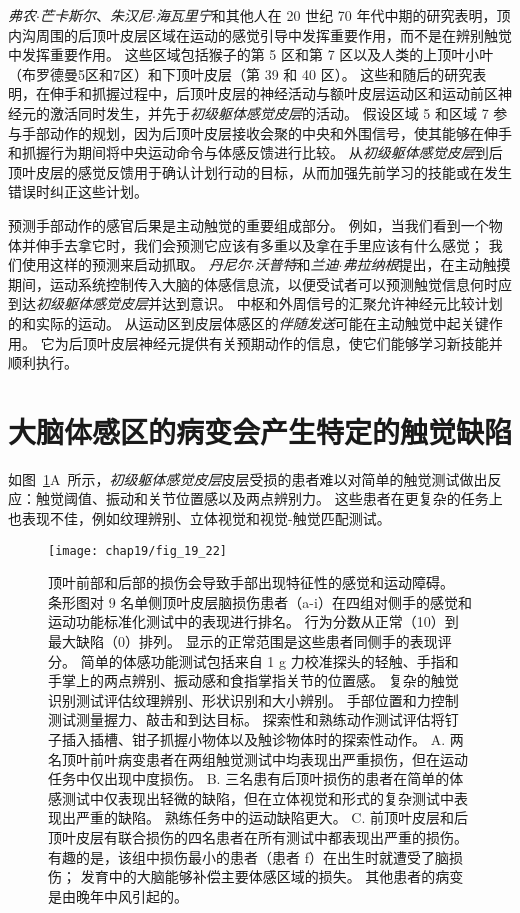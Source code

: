 \textit{弗农$\cdot$芒卡斯尔}、\textit{朱汉尼$\cdot$海瓦里宁}和其他人在 20 世纪 70 年代中期的研究表明，顶内沟周围的后顶叶皮层区域在运动的感觉引导中发挥重要作用，而不是在辨别触觉中发挥重要作用。
这些区域包括猴子的第 5 区和第 7 区以及人类的上顶叶小叶（布罗德曼5区和7区）和下顶叶皮层（第 39 和 40 区）。
这些和随后的研究表明，在伸手和抓握过程中，后顶叶皮层的神经活动与额叶皮层运动区和运动前区神经元的激活同时发生，并先于\textit{初级躯体感觉皮层}的活动。
假设区域 5 和区域 7 参与手部动作的规划，因为后顶叶皮层接收会聚的中央和外围信号，使其能够在伸手和抓握行为期间将中央运动命令与体感反馈进行比较。
从\textit{初级躯体感觉皮层}到后顶叶皮层的感觉反馈用于确认计划行动的目标，从而加强先前学习的技能或在发生错误时纠正这些计划。


预测手部动作的感官后果是主动触觉的重要组成部分。
例如，当我们看到一个物体并伸手去拿它时，我们会预测它应该有多重以及拿在手里应该有什么感觉；
我们使用这样的预测来启动抓取。
\textit{丹尼尔$\cdot$沃普特}和\textit{兰迪$\cdot$弗拉纳根}提出，在主动触摸期间，运动系统控制传入大脑的体感信息流，以便受试者可以预测触觉信息何时应到达\textit{初级躯体感觉皮层}并达到意识。 
中枢和外周信号的汇聚允许神经元比较计划的和实际的运动。
从运动区到皮层体感区的\textit{伴随发送}可能在主动触觉中起关键作用。
它为后顶叶皮层神经元提供有关预期动作的信息，使它们能够学习新技能并顺利执行。



\section{大脑体感区的病变会产生特定的触觉缺陷}

如图~\ref{fig:19_22}A~所示，\textit{初级躯体感觉皮层}皮层受损的患者难以对简单的触觉测试做出反应：触觉阈值、振动和关节位置感以及两点辨别力。
这些患者在更复杂的任务上也表现不佳，例如纹理辨别、立体视觉和视觉-触觉匹配测试。


\begin{figure}[htbp]
	\centering
	\texttt{[image: chap19/fig\_19\_22]}
	\caption{顶叶前部和后部的损伤会导致手部出现特征性的感觉和运动障碍。
		条形图对 9 名单侧顶叶皮层脑损伤患者（a-i）在四组对侧手的感觉和运动功能标准化测试中的表现进行排名。
		行为分数从正常（10）到最大缺陷（0）排列。
		显示的正常范围是这些患者同侧手的表现评分。
		简单的体感功能测试包括来自 1 g 力校准探头的轻触、手指和手掌上的两点辨别、振动感和食指掌指关节的位置感。
		复杂的触觉识别测试评估纹理辨别、形状识别和大小辨别。
		手部位置和力控制测试测量握力、敲击和到达目标。
		探索性和熟练动作测试评估将钉子插入插槽、钳子抓握小物体以及触诊物体时的探索性动作\cite{pause1989sensorimotor}。
		A. 两名顶叶前叶病变患者在两组触觉测试中均表现出严重损伤，但在运动任务中仅出现中度损伤。
		B. 三名患有后顶叶损伤的患者在简单的体感测试中仅表现出轻微的缺陷，但在立体视觉和形式的复杂测试中表现出严重的缺陷。
		熟练任务中的运动缺陷更大。
		C. 前顶叶皮层和后顶叶皮层有联合损伤的四名患者在所有测试中都表现出严重的损伤。
		有趣的是，该组中损伤最小的患者（患者 f）在出生时就遭受了脑损伤；
		发育中的大脑能够补偿主要体感区域的损失。
		其他患者的病变是由晚年中风引起的。}
	\label{fig:19_22}
\end{figure}


